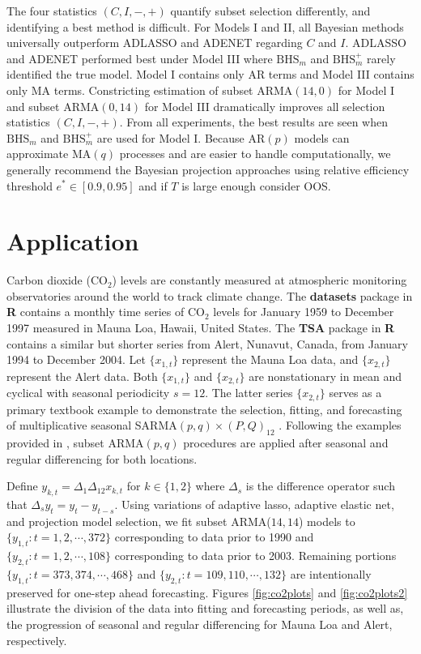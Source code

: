 The four statistics $(C,I,-,+)$ quantify subset selection differently, and identifying a best method is difficult. For Models I and II, all Bayesian methods universally outperform ADLASSO and ADENET regarding $C$ and $I$. ADLASSO and ADENET performed best under Model III where $\textrm{BHS}_m$ and $\textrm{BHS}^+_m$ rarely identified the true model. Model I contains only AR terms and Model III contains only MA terms. Constricting estimation of subset ARMA$(14,0)$ for Model I and subset ARMA$(0,14)$ for Model III dramatically improves all selection statistics $(C,I,-,+)$. From all experiments, the best results are seen when $\textrm{BHS}_m$ and $\textrm{BHS}^+_m$ are used for Model I. Because AR$(p)$ models can approximate MA$(q)$ processes and are easier to handle computationally, we generally recommend the Bayesian projection approaches using relative efficiency threshold $e^*\in [0.9,0.95]$ and if $T$ is large enough consider OOS. 










\section{Application}
\label{sec:co2app}
Carbon dioxide ($\textrm{CO}_2$) levels are constantly measured at atmospheric monitoring observatories around the world to track climate change. The {\bf datasets} package in {\bf R} \citep{RCORETEAM} contains a monthly time series of  $\textrm{CO}_2$ levels for January 1959 to December 1997 measured in Mauna Loa, Hawaii, United States. The {\bf TSA} package in {\bf R} \citep{RTSA} contains a similar but shorter series  from Alert, Nunavut, Canada, from January 1994 to December 2004. Let $\{x_{1,t}\}$ represent the Mauna Loa data, and $\{x_{2,t}\}$ represent the Alert data. Both $\{x_{1,t}\}$ and $\{x_{2,t}\}$ are nonstationary in mean and cyclical with seasonal periodicity $s=12$. The latter series $\{x_{2,t}\}$ serves as a primary textbook example  to demonstrate the selection, fitting, and forecasting of multiplicative seasonal SARMA$(p,q)\times(P,Q)_{12}$ \citep[pp. 227-245]{Cryer2008}. Following the examples provided in \cite{Cryer2008,Chen2011}, subset ARMA$(p,q)$ procedures are applied after seasonal and regular differencing for both locations. 

Define $y_{k,t}=\Delta_1\Delta_{12}x_{k,t}$ for $k\in\{1,2\}$  where $\Delta_s$ is the difference operator such that $\Delta_s y_t=y_t-y_{t-s}$.  Using variations of adaptive lasso, adaptive elastic net, and projection model selection, we fit subset ARMA($14,14$) models to $\{y_{1,t}:t=1,2,\cdots,372\}$ corresponding to data prior to 1990 and $\{y_{2,t}:t=1,2,\cdots,108\}$ corresponding to data prior to 2003. Remaining portions $\{y_{1,t}:t=373,374,\cdots,468\}$ and $\{y_{2,t}:t=109,110,\cdots,132\}$ are intentionally preserved for one-step ahead forecasting. Figures \ref{fig:co2plots} and \ref{fig:co2plots2} illustrate the division of the data into fitting and forecasting periods, as well as, the progression of seasonal and regular differencing for Mauna Loa and Alert, respectively.

